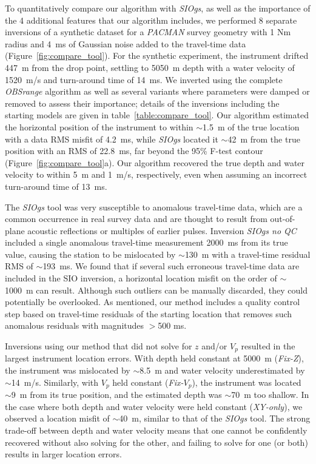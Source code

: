 To quantitatively compare our algorithm with \textit{SIOgs}, as well as the importance of the 4 additional features that our algorithm includes, we performed 8 separate inversions of a synthetic dataset for a \textit{PACMAN} survey geometry with 1 Nm radius and 4~ms of Gaussian noise added to the travel-time data (Figure~\ref{fig:compare_tool}). For the synthetic experiment, the instrument drifted 447~m from the drop point, settling to 5050~m depth with a water velocity of 1520~m/s and turn-around time of 14~ms. We inverted using the complete \textit{OBSrange} algorithm as well as several variants where parameters were damped or removed to assess their importance; details of the inversions including the starting models are given in table~\ref{table:compare_tool}. Our algorithm estimated the horizontal position of the instrument to within $\sim$1.5~m of the true location with a data RMS misfit of 4.2~ms, while \textit{SIOgs} located it $\sim$42~m from the true position with an RMS of 22.8~ms, far beyond the 95\% F-test contour (Figure~\ref{fig:compare_tool}a). Our algorithm recovered the true depth and water velocity to within 5~m and 1~m/s, respectively, even when assuming an incorrect turn-around time of 13~ms.

The \textit{SIOgs} tool was very susceptible to anomalous travel-time data, which are a common occurrence in real survey data and are thought to result from out-of-plane acoustic reflections or multiples of earlier pulses. Inversion \textit{SIOgs no QC} included a single anomalous travel-time measurement 2000~ms from its true value, causing the station to be mislocated by $\sim$130~m with a travel-time residual RMS of $\sim$193~ms. We found that if several such erroneous travel-time data are included in the SIO inversion, a horizontal location misfit on the order of $\sim$1000~m can result. Although such outliers can be manually discarded, they could potentially be overlooked. As mentioned, our method includes a quality control step based on travel-time residuals of the starting location that removes such anomalous residuals with magnitudes $>$500 ms.

Inversions using our method that did not solve for $z$ and/or $V_p$ resulted in the largest instrument location errors. With depth held constant at 5000~m (\textit{Fix-Z}), the instrument was mislocated by $\sim$8.5~m and water velocity underestimated by $\sim$14~m/s. Similarly, with $V_p$ held constant (\textit{Fix-$V_p$}), the instrument was located $\sim$9~m from its true position, and the estimated depth was $\sim$70~m too shallow. In the case where both depth and water velocity were held constant (\textit{XY-only}), we observed a location misfit of $\sim$40~m, similar to that of the \textit{SIOgs} tool. The strong trade-off between depth and water velocity means that one cannot be confidently recovered without also solving for the other, and failing to solve for one (or both) results in larger location errors.

